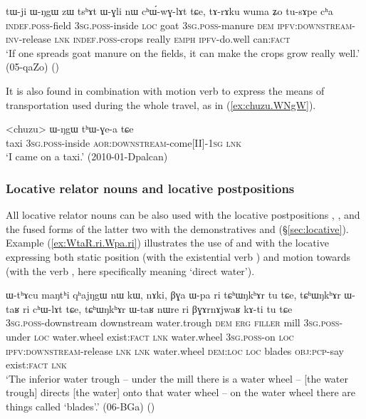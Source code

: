 \begin{exe}
\ex \label{ex:tWji.WNgW.chWwGlAt}
\gll tɯ-ji ɯ-ŋgɯ zɯ tsʰɤt ɯ-ɣli nɯ cʰɯ́-wɣ-lɤt tɕe, tɤ-rɤku wuma ʑo tu-sɤpe cʰa \\
\textsc{indef}.\textsc{poss}-field  \textsc{3sg}.\textsc{poss}-inside \textsc{loc} goat \textsc{3sg}.\textsc{poss}-manure \textsc{dem} \textsc{ipfv}:\textsc{downstream}-\textsc{inv}-release \textsc{lnk} \textsc{indef}.\textsc{poss}-crops really \textsc{emph} \textsc{ipfv}-do.well can:\textsc{fact} \\
\glt `If one spreads goat manure on the fields, it can make the crops grow really well.' (05-qaZo) 	()
\end{exe} 

It is also found in combination with motion verb to express the means of transportation used during the whole travel, as in (\ref{ex:chuzu.WNgW}).

\begin{exe}
\ex \label{ex:chuzu.WNgW}
\gll  <chuzu> ɯ-ŋgɯ tʰɯ-ɣe-a tɕe \\
taxi \textsc{3sg}.\textsc{poss}-inside \textsc{aor}:\textsc{downstream}-come[II]-\textsc{1sg} \textsc{lnk} \\
\glt `I came on a taxi.' (2010-01-Dpalcan)
\end{exe} 



\subsubsection{Locative relator nouns and locative postpositions} \label{sec:relator.postposition.location}
 All locative relator nouns can be also used with the locative postpositions , ,  and the fused forms of the latter two with the demonstratives  and  (§\ref{sec:locative}). Example (\ref{ex:WtaR.ri.Wpa.ri}) illustrates the use of  and  with the locative  expressing both static position (with the existential verb ) and motion towards (with the verb , here specifically meaning `direct water').

\begin{exe}
\ex \label{ex:WtaR.ri.Wpa.ri}
\gll ɯ-tʰɤcu maŋtʰi qʰajŋgɯ nɯ kɯ, nɤki, βɣa ɯ-pa ri tɕʰɯŋkʰɤr tu tɕe, tɕʰɯŋkʰɤr ɯ-taʁ ri cʰɯ-lɤt tɕe, tɕʰɯŋkʰɤr ɯ-taʁ nɯre ri βɣɤrnɤjwaʁ kɤ-ti tu tɕe \\
\textsc{3sg}.\textsc{poss}-downstream downstream water.trough \textsc{dem} \textsc{erg} \textsc{filler} mill \textsc{3sg}.\textsc{poss}-under \textsc{loc} water.wheel exist:\textsc{fact} \textsc{lnk} water.wheel \textsc{3sg}.\textsc{poss}-on \textsc{loc} \textsc{ipfv}:\textsc{downstream}-release \textsc{lnk} \textsc{lnk} water.wheel \textsc{dem}:\textsc{loc} \textsc{loc} blades \textsc{obj}:\textsc{pcp}-say exist:\textsc{fact} \textsc{lnk} \\
\glt `The inferior water trough -- under the mill there is a water wheel -- [the water trough] directs [the water] onto that water wheel -- on the water wheel there are things called `blades'.' (06-BGa) 	()
\end{exe}

